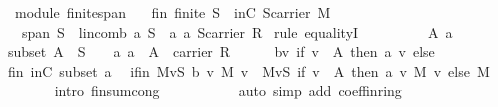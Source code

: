 \begin{isabellebody}
\begin{isamarkuptext}
\end{isamarkuptext}%
\isamarkuptrue%
\isamarkupfalse%
\ {\isacharparenleft}\ module{\isacharparenright}\ finite{\isacharunderscore}span{\isacharcolon}\isanewline
\ \ \ fin{\isacharcolon}\ {\isachardoublequoteopen}finite\ S{\isachardoublequoteclose}\ \ inC{\isacharcolon}\ {\isachardoublequoteopen}S{\isasymsubseteq}carrier\ M{\isachardoublequoteclose}\isanewline
\ \ \ {\isachardoublequoteopen}span\ S\ {\isacharequal}\ {\isacharbraceleft}lincomb\ a\ S\ {\isacharbar}\ a{\isachardot}\ a{\isasymin}\ {\isacharparenleft}S{\isasymrightarrow}carrier\ R{\isacharparenright}{\isacharbraceright}{\isachardoublequoteclose}\isanewline
%
\isadelimproof
%
\endisadelimproof
%
\isatagproof
{}\isamarkupfalse%
\ {\isacharparenleft}rule\ equalityI{\isacharparenright}\ \isanewline
\ \ \isacommand{{\isacharbraceleft}}\isamarkupfalse%
\isanewline
\ \ \ \ \isamarkupfalse%
\ A\ a\isanewline
\ \ \ \ \isamarkupfalse%
\ subset{\isacharcolon}\ {\isachardoublequoteopen}A\ {\isasymsubseteq}\ S{\isachardoublequoteclose}\ \ \ \ a{\isacharcolon}\ {\isachardoublequoteopen}a\ {\isasymin}\ A\ {\isasymrightarrow}\ carrier\ R{\isachardoublequoteclose}\isanewline
\ \ \ \ \isamarkupfalse%
\ {\isacharquery}b{\isacharequal}{\isachardoublequoteopen}{\isacharparenleft}{\isasymlambda}v{\isachardot}\ if\ v\ {\isasymin}\ A\ then\ a\ v\ else\ {\isasymzero}{\isacharparenright}{\isachardoublequoteclose}\isanewline
\ \ \ \ \isamarkupfalse%
\ fin\ inC\ subset\ a\ \isamarkupfalse%
\ if{\isacharunderscore}in{\isacharcolon}\ {\isachardoublequoteopen}{\isacharparenleft}{\isasymOplus}\isactrlbsub M\isactrlesub v{\isasymin}S{\isachardot}\ {\isacharquery}b\ v\ {\isasymodot}\isactrlbsub M\isactrlesub \ v{\isacharparenright}\ {\isacharequal}\ {\isacharparenleft}{\isasymOplus}\isactrlbsub M\isactrlesub v{\isasymin}S{\isachardot}\ {\isacharparenleft}if\ v\ {\isasymin}\ A\ then\ a\ v\ {\isasymodot}\isactrlbsub M\isactrlesub \ v\ else\ {\isasymzero}\isactrlbsub M\isactrlesub {\isacharparenright}{\isacharparenright}{\isachardoublequoteclose}\isanewline
\ \ \ \ \ \ \isamarkupfalse%
\ {\isacharparenleft}intro\ finsum{\isacharunderscore}cong{\isacharprime}{\isacharparenright}\ \isanewline
\ \ \ \ \ \ \ \ \isamarkupfalse%
\ {\isacharparenleft}auto\ simp\ add{\isacharcolon}\ coeff{\isacharunderscore}in{\isacharunderscore}ring{\isacharparenright}\ \ \isanewline

\end{isabellebody}
